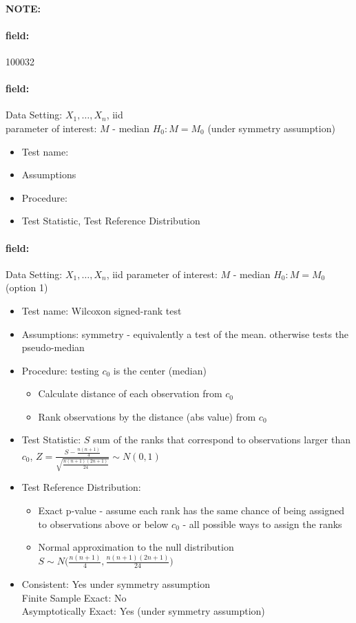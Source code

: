 \documentclass[12pt]{article}
\newenvironment{note}{\paragraph{NOTE:}}{}
\newenvironment{field}{\paragraph{field:}}{}
\begin{document}
\begin{note} \begin{field} \tiny 100032 \end{field}
 \begin{field}
  Data Setting: $X_1, \ldots, X_n$, iid \\
  parameter of interest: $M$ - median $H_0: M = M_0$ (under symmetry assumption)
  \begin{itemize}
   \item Test name:
   \item Assumptions
   \item Procedure:
   \item Test Statistic, Test Reference Distribution
  \end{itemize}
 \end{field}
 \begin{field}
  Data Setting: $X_1, \ldots, X_n$, iid parameter of interest: $M$ - median $H_0: M = M_0$ (option 1)
  \begin{itemize}
   \item Test name: Wilcoxon signed-rank test
   \item Assumptions: symmetry - equivalently a test of the mean. otherwise tests the pseudo-median
   \item Procedure: testing $c_0$ is the center (median)
         \begin{itemize}
          \item Calculate distance of each observation from $c_0$
          \item Rank observations by the distance (abs value) from $c_0$
         \end{itemize}
   \item Test Statistic: $S$ sum of the ranks that correspond to observations larger than $c_0$, $Z = \frac{S - \frac{n(n+1)}{4}}{\sqrt{\frac{n(n+1)(2n+1)}{24}}} \sim N(0,1)$
   \item Test Reference Distribution:
         \begin{itemize}
          \item Exact p-value - assume each rank has the same chance of being assigned to observations above or below $c_0$ - all possible ways to assign the ranks
          \item Normal approximation to the null distribution $S \sim N\big(\frac{n(n+1)}{4}, \frac{n(n+1)(2n+1)}{24}\big)$
         \end{itemize}
   \item Consistent: Yes under symmetry assumption \\ Finite Sample Exact: No\\ Asymptotically Exact: Yes (under symmetry assumption)
  \end{itemize}
 \end{field}
\end{note}
\end{document}
